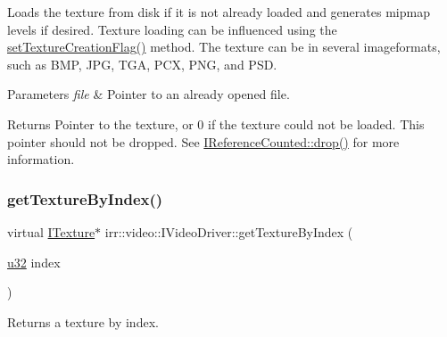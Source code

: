 Loads the texture from disk if it is not already loaded and generates mipmap levels if desired. Texture loading can be influenced using the \hyperlink{classirr_1_1video_1_1IVideoDriver_a868b58a6b86b9e4841ca3879ce246c4e}{set\+Texture\+Creation\+Flag()} method. The texture can be in several imageformats, such as B\+MP, J\+PG, T\+GA, P\+CX, P\+NG, and P\+SD. 
\begin{DoxyParams}{Parameters}
{\em file} & Pointer to an already opened file. \\
\hline
\end{DoxyParams}
\begin{DoxyReturn}{Returns}
Pointer to the texture, or 0 if the texture could not be loaded. This pointer should not be dropped. See \hyperlink{classirr_1_1IReferenceCounted_a03856a09355b89d178090c4a5f738543}{I\+Reference\+Counted\+::drop()} for more information. 
\end{DoxyReturn}
\mbox{\label{classirr_1_1video_1_1IVideoDriver_abfe395b1320ac52cea6be0e912135351}} 
\subsubsection{\texorpdfstring{get\+Texture\+By\+Index()}{getTextureByIndex()}\hspace{0.1cm}{\footnotesize\ttfamily [1/2]}}
{\footnotesize\ttfamily virtual \hyperlink{classirr_1_1video_1_1ITexture}{I\+Texture}$\ast$ irr\+::video\+::\+I\+Video\+Driver\+::get\+Texture\+By\+Index (\begin{DoxyParamCaption}\item[{\hyperlink{namespaceirr_a0416a53257075833e7002efd0a18e804}{u32}}]{index }\end{DoxyParamCaption})\hspace{0.3cm}{\ttfamily [pure virtual]}}



Returns a texture by index. 


